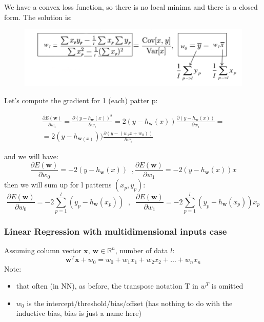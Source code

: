 \documentclass[../main.tex]{subfiles}
\begin{document}
We have a convex loss function, so there is no local minima and there is a closed form. The solution is:
\begin{figure}[H]
    \centering
    \includegraphics[scale = 0.4]{lectures/2_linear_model/solution_regression_two_par.png}
\end{figure}

Let's compute the gradient for 1 (each) patter p:



\begin{equation*}\label{eq:pareto mle2}
    \begin{aligned}
    \frac{\partial E(\mathbf{w})}{\partial{w_i}} = \frac{\partial(y-h_{\textbf{w}}(x))^2}{\partial{w_i}} =
    2(y-h_{\textbf{w}}(x))\frac{\partial(y-h_{\textbf{w}}(x))}{\partial{w_i}} =\\
    =2(y-h_{\textbf{w}(x)}))\frac{\partial(y-(w_1x+w_0))}{\partial{w_i}}
    \end{aligned}
\end{equation*}

and we will have:
$$
\frac{\partial E(\mathbf{w})}{\partial{w_0}} = -2(y - h_{\mathbf{w}}(x)) \; \; , \frac{\partial E(\mathbf{w})}{\partial{w_1}} = -2(y - h_{\mathbf{w}}(x))x
$$
then we will sum up for l patterns $(x_p,y_p)$:
$$
\frac{\partial E(\mathbf{w})}{\partial{w_0}} = -2\sum_{p = 1}^{l}(y_p - h_{\mathbf{w}}(x_p)) \; \; ,\; \; \frac{\partial E(\mathbf{w})}{\partial{w_1}} = -2\sum_{p = 1}^{l}(y_p - h_{\mathbf{w}}(x_p))x_p
$$

\subsubsection{Linear Regression with multidimensional inputs case}
Assuming column vector $\mathbf{x},\, \mathbf{w} \in \mathbb{R}^n$, number of data $l$:
$$ \mathbf{w}^T\mathbf{x} + w_0 = w_0 +w_1 x_1 + w_2 x_2 + \dots + w_n x_n$$
Note:
\begin{itemize}
    \item that often (in NN), as before, the transpose notation T in $w^T$ is omitted
    \item $w_0$ is the intercept/threshold/bias/offset (has nothing to do with the inductive bias, bias is just a name here)
\end{itemize}
\end{document}
